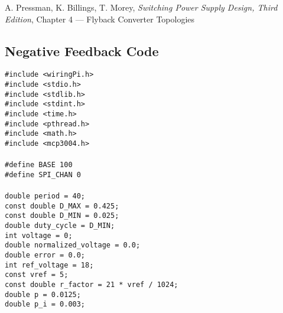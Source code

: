 \documentclass[a4paper, 12pt]{article}
\begin{document}

\begin{thebibliography}
	 A. Pressman, K. Billings, T. Morey, \textit{Switching Power Supply Design, Third Edition}, Chapter 4 --- Flyback Converter Topologies
\end{thebibliography}

\begin{appendices}
	\section{Negative Feedback Code}
	\texttt{\#include <wiringPi.h>} \\\noindent
	\texttt{\#include <stdio.h>} \\\noindent
	\texttt{\#include <stdlib.h>} \\\noindent
	\texttt{\#include <stdint.h>} \\\noindent
	\texttt{\#include <time.h>} \\\noindent
	\texttt{\#include <pthread.h>} \\\noindent
	\texttt{\#include <math.h>} \\\noindent
	\texttt{\#include <mcp3004.h>} \\\noindent
	\texttt{ \\\noindent}
	\texttt{\#define BASE 100} \\\noindent
	\texttt{\#define SPI\_CHAN 0} \\\noindent
	\texttt{ \\\noindent}
	\texttt{double period = 40;} \\\noindent
	\texttt{const double D\_MAX = 0.425;} \\\noindent
	\texttt{const double D\_MIN = 0.025;} \\\noindent
	\texttt{double duty\_cycle = D\_MIN;} \\\noindent
	\texttt{int voltage = 0;} \\\noindent
	\texttt{double normalized\_voltage = 0.0;} \\\noindent
	\texttt{double error = 0.0;} \\\noindent
	\texttt{int ref\_voltage = 18;} \\\noindent
	\texttt{const vref = 5;} \\\noindent
	\texttt{const double r\_factor = 21 * vref / 1024;} \\\noindent
	\texttt{double p = 0.0125;} \\\noindent
	\texttt{double p\_i = 0.003;} \\\noindent

\end{appendices}
\end{document}
